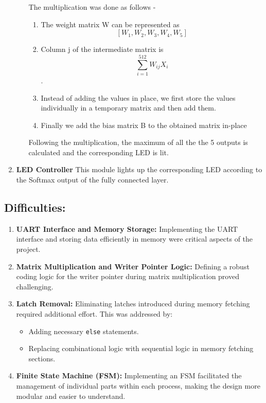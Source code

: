 \documentclass{article}
\begin{document}
\begin{enumerate}
\begin{itemize}
The multiplication was done as follows - 
    \begin{enumerate}
        \item The weight matrix W can be represented as
        \[[W_1, W_2, W_3, W_{4}, W_{5}]\]

        \item Column j of the intermediate matrix is \[\sum_{i=1}^{512}{W_{ij}X_{i}}\].
    
        \item Instead of adding the values in place, we first store the values individually in a temporary matrix and then add them.
        \item Finally we add the bias matrix B to the obtained matrix in-place
    \end{enumerate}
Following the multiplication, the maximum of all the the 5 outputs is calculated and the corresponding LED is lit.
 \end{itemize}
\item \textbf{LED Controller}
 This module lights up the corresponding LED according to the Softmax output of the fully connected layer.
 \end{enumerate}
\subsection{Difficulties:}
\begin{enumerate}
    \item \textbf{UART Interface and Memory Storage:}
Implementing the UART interface and storing data efficiently in memory were critical aspects of the project.

    \item \textbf{Matrix Multiplication and Writer Pointer Logic:}
Defining a robust coding logic for the writer pointer during matrix multiplication proved challenging.

    \item \textbf{Latch Removal:}
Eliminating latches introduced during memory fetching required additional effort. This was addressed by:

\begin{itemize}
        \item Adding necessary \verb|else| statements.
        \item Replacing combinational logic with sequential logic in memory fetching sections.
\end{itemize}

    \item \textbf{Finite State Machine (FSM):}
Implementing an FSM facilitated the management of individual parts within each process, making the design more modular and easier to understand.
\end{enumerate}
\end{document}
